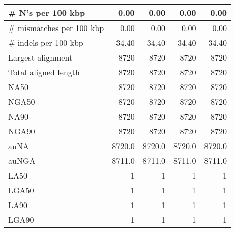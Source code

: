 \documentclass[12pt,a4paper]{article}
\begin{document}
\begin{table}[ht]
\begin{center}
\begin{tabular}{|l*{4}{|r}|}
\# N's per 100 kbp & 0.00 & 0.00 & 0.00 & 0.00 \\ \hline
\# mismatches per 100 kbp & 0.00 & 0.00 & 0.00 & 0.00 \\ \hline
\# indels per 100 kbp & 34.40 & 34.40 & 34.40 & 34.40 \\ \hline
Largest alignment & 8720 & 8720 & 8720 & 8720 \\ \hline
Total aligned length & 8720 & 8720 & 8720 & 8720 \\ \hline
NA50 & 8720 & 8720 & 8720 & 8720 \\ \hline
NGA50 & 8720 & 8720 & 8720 & 8720 \\ \hline
NA90 & 8720 & 8720 & 8720 & 8720 \\ \hline
NGA90 & 8720 & 8720 & 8720 & 8720 \\ \hline
auNA & 8720.0 & 8720.0 & 8720.0 & 8720.0 \\ \hline
auNGA & 8711.0 & 8711.0 & 8711.0 & 8711.0 \\ \hline
LA50 & 1 & 1 & 1 & 1 \\ \hline
LGA50 & 1 & 1 & 1 & 1 \\ \hline
LA90 & 1 & 1 & 1 & 1 \\ \hline
LGA90 & 1 & 1 & 1 & 1 \\ \hline
\end{tabular}
\end{center}
\end{table}
\end{document}
